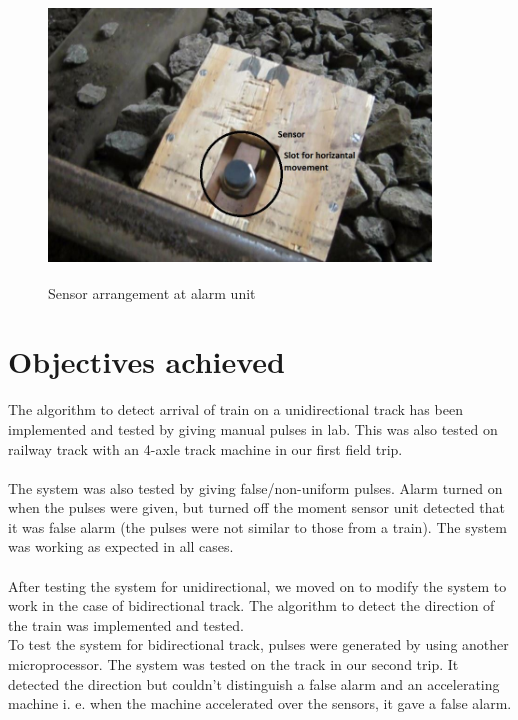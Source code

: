 \documentclass[aps,letterpaper,11pt]{article}
\begin{document}
\begin{figure}[H]
\begin{center}
\includegraphics[height = 3in,width=4in,angle=00]{figures/sensor1.JPG}
\caption{\small Sensor arrangement at alarm unit}
\end{center}
\end{figure}

\section{Objectives achieved}
The algorithm to detect arrival of train on a unidirectional track has been implemented and tested by
giving manual pulses in lab. This was also tested on railway track with an 4-axle track machine in our
first field trip. \\ \\
The system was also tested by giving false/non-uniform pulses. Alarm turned on when the pulses were
given, but turned off the moment sensor unit detected that it was false alarm (the pulses were not similar
to those from a train). The system was working as expected in all cases. \\ \\
After testing the system for unidirectional, we moved on to modify the system to work in the case of
bidirectional track. The algorithm to detect the direction of the train was implemented and tested. \\
To test the system for bidirectional track, pulses were generated by using another microprocessor. The
system was tested on the track in our second trip. It detected the
direction but couldn't distinguish a false alarm and an accelerating machine i.
e. when the machine accelerated over the sensors, it gave a false alarm.
\\
\end{document}
